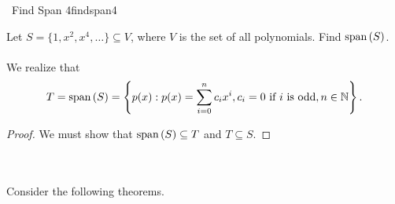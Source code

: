         \pagebreak
        \begin{example}{\Difficulty\,\Difficulty\,\,Find Span 4}{findspan4}
            
            Let \(S=\{1,x^2,x^4,\ldots\}\subseteq V\), where \(V\) is the set of all polynomials. Find \(\text{span\,}(S)\).
            \\
            \\
            We realize that
            \begin{align*}
                T=\text{span\,}(S)=\left\{p(x):p(x)=\sum_{i=0}^n c_ix^i, c_i=0\text{ if }i\text{ is odd},n\in\mathbb{N}\right\}.
            \end{align*}
            \begin{proof}
                We must show that \(\text{span\,}(S)\subseteq T\) and \(T\subseteq S\).
            \end{proof}

        \end{example}
        \pagebreak
        \vphantom
        \\
        \\
        Consider the following theorems.
